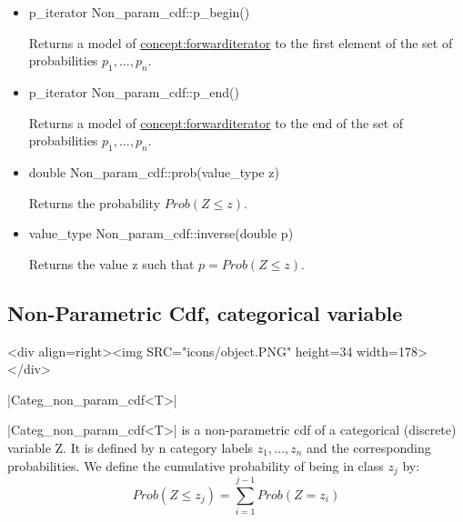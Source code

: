 \documentclass[12pt,twoside]{report}
\begin{document}
\begin{itemize}
\item
 \begin{code}
p_iterator Non_param_cdf::p_begin()
\end{code}

Returns a model of \hyperref{Forward Iterator}{Forward Iterator (see Section}{)}{concept:forwarditerator} to the first element of the set of probabilities $p_1,\ldots,p_n$.

\item
 \begin{code}
p_iterator Non_param_cdf::p_end()
\end{code}

Returns a model of \hyperref{Forward Iterator}{Forward Iterator (see Section}{)}{concept:forwarditerator} to the end of the set of probabilities $p_1,\ldots,p_n$.


\item 
\begin{code}
double Non_param_cdf::prob(value_type z)
\end{code}

Returns the probability $Prob(Z \le z)$.

\item 
\begin{code}
value_type Non_param_cdf::inverse(double p)
\end{code}

Returns the value z such that $p=Prob(Z \le z)$.

\end{itemize}








\subsection{Non-Parametric Cdf, categorical variable}
\begin{htmlonly}
<div align=right><img SRC="icons/object.PNG" height=34 width=178></div>
\end{htmlonly}

|Categ_non_param_cdf<T>|
\vspace{0.3cm}

|Categ_non_param_cdf<T>| is a non-parametric cdf of a categorical (discrete) variable Z. It is defined by n category labels $z_1,\ldots, z_n$ and the corresponding probabilities. 
We define the cumulative probability of being in class $z_j$ by: 
\begin{displaymath}
  Prob(Z\le z_j)=\sum_{i=1}^{j-1} Prob(Z=z_i)
\end{displaymath}
\end{document}
